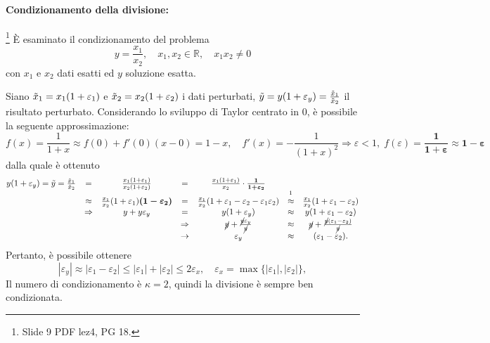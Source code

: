 \paragraph{Condizionamento della divisione:}\footnote{Slide 9 PDF lez4, PG 18.} È esaminato il condizionamento del problema
\begin{equation}\label{eq:probDiv}
        y=\frac{x_1}{x_2},\quad x_1,x_2\in\mathbb R,\quad x_1x_2\neq 0
\end{equation}
con $x_1$ e $x_2$ dati esatti ed $y$ soluzione esatta.

Siano $\Tilde{x}_1=x_1(1+\varepsilon_1)$ e $ \Tilde{x}_2=x_2(1+\varepsilon_2)$ i dati perturbati,  $\Tilde{y}= y(1+\varepsilon_y)=\frac{\Tilde{x}_1}{\Tilde{x}_2}$ il risultato perturbato. Considerando lo sviluppo di Taylor centrato in 0, è possibile la seguente approssimazione:
\begin{equation*}
    f(x)=\frac{1}{1+x}\approx f(0)+f'(0)(x-0)=1-x,\quad f'(x)=-\frac{1}{(1+x)^2}\Rightarrow \varepsilon<1,\;f(\varepsilon)=\boldsymbol{\frac{1}{1+\varepsilon}\approx1-\varepsilon}
\end{equation*}
dalla quale è ottenuto
\begin{equation*}
    \begin{matrix}
        y(1+\varepsilon_y)=\Tilde{y}=\frac{\Tilde{x}_1}{\Tilde{x}_2}&=&\frac{x_1(1+\varepsilon_1)}{x_2(1+\varepsilon_2)}&=&\frac{x_1(1+\varepsilon_1)}{x_2}\cdot\boldsymbol{\frac{1}{1+\varepsilon_2}}\\
        &\approx&\frac{x_1}{x_2}(1+\varepsilon_1)\boldsymbol{(1-\varepsilon_2)}&=&\frac{x_1}{x_2}(1+\varepsilon_1-\varepsilon_2-\varepsilon_1\varepsilon_2) &\overset{\footnotemark}{\approx}&\frac{x_1}{x_2}(1+\varepsilon_1-\varepsilon_2)\\
        &\Rightarrow&  y+y\varepsilon_y&=&y(1+\varepsilon_y)&\approx&y(1+\varepsilon_1-\varepsilon_2)\\
        &&&\Rightarrow& \cancel{y}+\frac{\cancel{y}\varepsilon_y}{\cancel{y}}&\approx&\cancel{y}+\frac{\cancel{y}(\varepsilon_1-\varepsilon_2)}{\cancel{y}}\\
        &&&\rightarrow& \varepsilon_y &\approx& (\varepsilon_1-\varepsilon_2).
    \end{matrix}
\end{equation*}
Pertanto, è possibile ottenere
\begin{equation*}
    |\varepsilon_y|\approx|\varepsilon_1-\varepsilon_2|\leq |\varepsilon_1|+|\varepsilon_2|\leq 2\varepsilon_x,\quad \varepsilon_x=\max\{|\varepsilon_1|,|\varepsilon_2|\},
\end{equation*}
Il numero di condizionamento è $\kappa=2$, quindi la divisione è sempre ben condizionata.